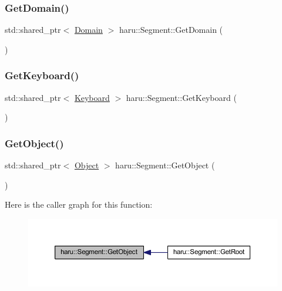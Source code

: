 \subsubsection{\texorpdfstring{Get\+Domain()}{GetDomain()}}
{\footnotesize\ttfamily std\+::shared\+\_\+ptr$<$ \mbox{\hyperlink{class_domain}{Domain}} $>$ haru\+::\+Segment\+::\+Get\+Domain (\begin{DoxyParamCaption}{ }\end{DoxyParamCaption})}

\mbox{\label{classharu_1_1_segment_ad33423dcc7119727b1fd2cd2a70ecdbf}} 
\subsubsection{\texorpdfstring{Get\+Keyboard()}{GetKeyboard()}}
{\footnotesize\ttfamily std\+::shared\+\_\+ptr$<$ \mbox{\hyperlink{class_keyboard}{Keyboard}} $>$ haru\+::\+Segment\+::\+Get\+Keyboard (\begin{DoxyParamCaption}{ }\end{DoxyParamCaption})}

\mbox{\label{classharu_1_1_segment_ae4262d0dbfca541db24d43e8925e9d8a}} 
\subsubsection{\texorpdfstring{Get\+Object()}{GetObject()}}
{\footnotesize\ttfamily std\+::shared\+\_\+ptr$<$ \mbox{\hyperlink{classharu_1_1_object}{Object}} $>$ haru\+::\+Segment\+::\+Get\+Object (\begin{DoxyParamCaption}{ }\end{DoxyParamCaption})}

Here is the caller graph for this function\+:
\nopagebreak
\begin{figure}[H]
\begin{center}
\leavevmode
\includegraphics[width=350pt]{classharu_1_1_segment_ae4262d0dbfca541db24d43e8925e9d8a_icgraph}
\end{center}
\end{figure}
\mbox{\label{classharu_1_1_segment_adf664884cf9c2b20fc3c8b6944f1ff63}} 
